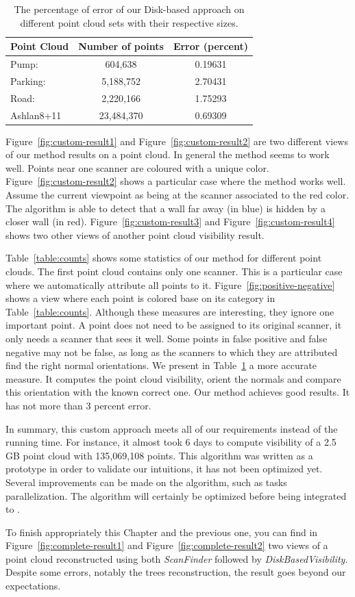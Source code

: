 \begin{table}[]
  \centering
  \begin{tabular}{l|c|c}
    Point Cloud & Number of points & Error (percent) \\\hline
    Pump: & 604,638 &  0.19631 \\\hline
    Parking: & 5,188,752 & 2.70431 \\\hline
    Road: & 2,220,166 & 1.75293 \\\hline
    Ashlan8+11 & 23,484,370 & 0.69309
  \end{tabular}
  \caption{The percentage of error of our Disk-based approach on different point cloud sets with their respective sizes.}
  \label{table:vis-error}
\end{table}
Figure~\ref{fig:custom-result1} and Figure~\ref{fig:custom-result2} are two different views of our method results on a point cloud. In general the method seems to work well. Points near one scanner are coloured with a unique color. Figure~\ref{fig:custom-result2} shows a particular case where the method works well. Assume the current viewpoint as being at the scanner associated to the red color. The algorithm is able to detect that a wall far away (in blue) is hidden by a closer wall (in red). Figure~\ref{fig:custom-result3} and Figure~\ref{fig:custom-result4} shows two other views of another point cloud visibility result.

Table~\ref{table:counts} shows some statistics of our method for different point clouds. The first point cloud contains only one scanner. This is a particular case where we automatically attribute all points to it. Figure~\ref{fig:positive-negative} shows a view where each point is colored base on its category in Table~\ref{table:counts}. Although these measures are interesting, they ignore one important point. A point does not need to be assigned to its original scanner,
it only needs a scanner that sees it well. Some points in false positive and false negative may not be false, as long as the scanners to which they are attributed find the right normal orientations. We present in Table~\ref{table:vis-error} a more accurate measure. It computes the point cloud visibility, orient the normals and compare this orientation with the known correct one. Our method achieves good results. It has not more than $3$ percent error.

In summary, this custom approach meets all of our requirements instead of the running time. For instance, it almost took 6 days to compute visibility of a 2.5 GB point cloud with 135,069,108 points. This algorithm was written as a prototype in order to validate our intuitions, it has not been optimized yet. Several improvements can be made on the algorithm, such as tasks parallelization. The algorithm will certainly be optimized before being integrated to \CC.

To finish appropriately this Chapter and the previous one, you can find in Figure~\ref{fig:complete-result1} and Figure~\ref{fig:complete-result2} two views of a point cloud reconstructed using both \emph{ScanFinder} followed by \emph{DiskBasedVisibility}. Despite some errors, notably the trees reconstruction, the result goes beyond our expectations.
